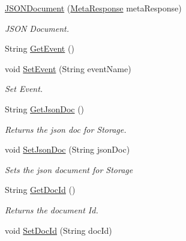 \begin{DoxyCompactItemize}
\item 
\hyperlink{classcom_1_1shephertz_1_1app42_1_1paas_1_1sdk_1_1windows_1_1_meta_response_1_1_j_s_o_n_document_afde1fc697aa55d473d787f67085bd77f}{J\+S\+O\+N\+Document} (\hyperlink{classcom_1_1shephertz_1_1app42_1_1paas_1_1sdk_1_1windows_1_1_meta_response}{Meta\+Response} meta\+Response)
\begin{DoxyCompactList}\small\item\em J\+S\+O\+N Document. \end{DoxyCompactList}\item 
String \hyperlink{classcom_1_1shephertz_1_1app42_1_1paas_1_1sdk_1_1windows_1_1_meta_response_1_1_j_s_o_n_document_a2bf006df40c02e1e79964a1a0d84aa39}{Get\+Event} ()
\item 
void \hyperlink{classcom_1_1shephertz_1_1app42_1_1paas_1_1sdk_1_1windows_1_1_meta_response_1_1_j_s_o_n_document_a69bb4d950d32a1cfc46c98d8f0402a1b}{Set\+Event} (String event\+Name)
\begin{DoxyCompactList}\small\item\em Set Event. \end{DoxyCompactList}\item 
String \hyperlink{classcom_1_1shephertz_1_1app42_1_1paas_1_1sdk_1_1windows_1_1_meta_response_1_1_j_s_o_n_document_a9dce243c5da2ce39642446cb835a9296}{Get\+Json\+Doc} ()
\begin{DoxyCompactList}\small\item\em Returns the json doc for Storage. \end{DoxyCompactList}\item 
void \hyperlink{classcom_1_1shephertz_1_1app42_1_1paas_1_1sdk_1_1windows_1_1_meta_response_1_1_j_s_o_n_document_a12a53dc9da4ed7efd8994412d2766160}{Set\+Json\+Doc} (String json\+Doc)
\begin{DoxyCompactList}\small\item\em Sets the json document for Storage \end{DoxyCompactList}\item 
String \hyperlink{classcom_1_1shephertz_1_1app42_1_1paas_1_1sdk_1_1windows_1_1_meta_response_1_1_j_s_o_n_document_a9111af8034b048b69ed9c6c2441e5252}{Get\+Doc\+Id} ()
\begin{DoxyCompactList}\small\item\em Returns the document Id. \end{DoxyCompactList}\item 
void \hyperlink{classcom_1_1shephertz_1_1app42_1_1paas_1_1sdk_1_1windows_1_1_meta_response_1_1_j_s_o_n_document_acbd85245537067080fc7d49b0a2f0aa1}{Set\+Doc\+Id} (String doc\+Id)

\end{DoxyCompactItemize}
